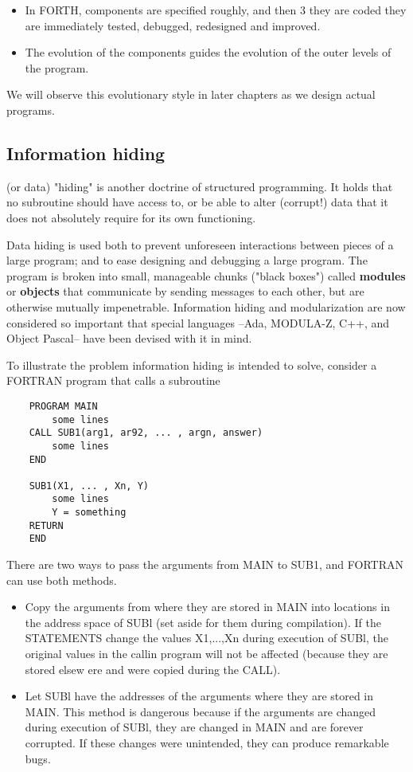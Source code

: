 \begin{itemize}
    \item In FORTH, components are specified roughly, and then 3 they are coded they are immediately tested, debugged, redesigned and improved.
    \item The evolution of the components guides the evolution of the outer levels of the program.
\end{itemize}

We will observe this evolutionary style in later chapters as we design actual programs.

\subsection{Information hiding}

 (or data) "hiding" is another doctrine of structured programming. It holds that no subroutine should have access to, or be able to alter (corrupt!) data that it does not absolutely require for its own functioning.

Data hiding is used both to prevent unforeseen interactions between pieces of a large program; and to ease designing and debugging a large program. The program is broken into small, manageable chunks ("black boxes") called \textbf{modules} or \textbf{objects} that communicate by sending messages to each other, but are otherwise mutually impenetrable. Information hiding and modularization are now considered so important that special languages --Ada, MODULA-Z, C++, and Object Pascal-- have been devised with it in mind.

To illustrate the problem information hiding is intended to solve, consider a FORTRAN program that calls a subroutine

\begin{lstlisting}
    PROGRAM MAIN
        some lines
    CALL SUB1(arg1, ar92, ... , argn, answer)
        some lines
    END

    SUB1(X1, ... , Xn, Y)
        some lines
        Y = something
    RETURN
    END
\end{lstlisting}

There are two ways to pass the arguments from MAIN to SUB1, and FORTRAN can use both methods.

\begin{itemize}
    \item Copy the arguments from where they are stored in MAIN into locations in the address space of SUBl (set aside for them during compilation). If the STATEMENTS change the values X1,...,Xn during execution of SUBl, the original values in the callin program will not be affected (because they are stored elsew ere and were copied during the CALL).
    \item Let SUBl have the addresses of the arguments where they are stored in MAIN. This method is dangerous because if the arguments are changed during execution of SUBl, they are changed in MAIN and are forever corrupted. If these changes were unintended, they can produce remarkable bugs.
\end{itemize}

